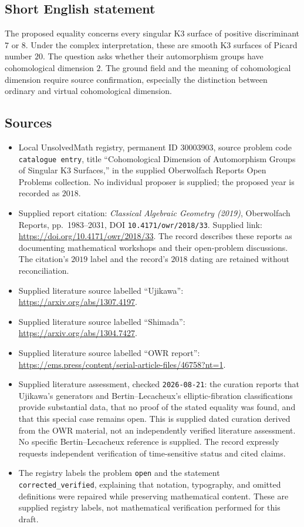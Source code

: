 \documentclass[11pt]{article}
\begin{document}
\subsection{Short English statement}
The proposed equality concerns every singular K3 surface of positive discriminant \(7\) or \(8\). Under the complex interpretation, these are smooth K3 surfaces of Picard number \(20\). The question asks whether their automorphism groups have cohomological dimension \(2\). The ground field and the meaning of cohomological dimension require source confirmation, especially the distinction between ordinary and virtual cohomological dimension.
\subsection{Sources}
\begin{itemize}
\item Local UnsolvedMath registry, permanent ID \(30003903\), source problem code \texttt{catalogue entry}, title ``Cohomological Dimension of Automorphism Groups of Singular K3 Surfaces,'' in the supplied Oberwolfach Reports Open Problems collection. No individual proposer is supplied; the proposed year is recorded as \(2018\).
\item Supplied report citation: \emph{Classical Algebraic Geometry (2019)}, Oberwolfach Reports, pp.\ 1983--2031, DOI \texttt{10.4171/owr/2018/33}. Supplied link: \url{https://doi.org/10.4171/owr/2018/33}. The record describes these reports as documenting mathematical workshops and their open-problem discussions. The citation's \(2019\) label and the record's \(2018\) dating are retained without reconciliation.
\item Supplied literature source labelled ``Ujikawa'': \url{https://arxiv.org/abs/1307.4197}.
\item Supplied literature source labelled ``Shimada'': \url{https://arxiv.org/abs/1304.7427}.
\item Supplied literature source labelled ``OWR report'': \url{https://ems.press/content/serial-article-files/46758?nt=1}.
\item Supplied literature assessment, checked \texttt{2026-08-21}: the curation reports that Ujikawa's generators and Bertin--Lecacheux's elliptic-fibration classifications provide substantial data, that no proof of the stated equality was found, and that this special case remains open. This is supplied dated curation derived from the OWR material, not an independently verified literature assessment. No specific Bertin--Lecacheux reference is supplied. The record expressly requests independent verification of time-sensitive status and cited claims.
\item The registry labels the problem \texttt{open} and the statement \texttt{corrected\_verified}, explaining that notation, typography, and omitted definitions were repaired while preserving mathematical content. These are supplied registry labels, not mathematical verification performed for this draft.
\end{itemize}
\end{document}
